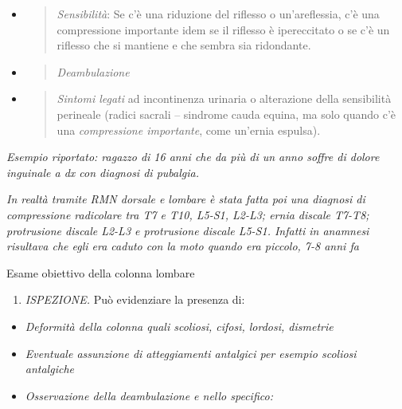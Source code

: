 \documentclass[]{article}
\begin{document}
\begin{itemize}
\item
  \begin{quote}
  \emph{\emph{Sensibilità}}: Se c'è una riduzione del riflesso o
  un'areflessia, c'è una compressione importante idem se il riflesso è
  ipereccitato o se c'è un riflesso che si mantiene e che sembra sia
  ridondante.
  \end{quote}
\end{itemize}

\begin{itemize}
\item
  \begin{quote}
  \emph{\emph{Deambulazione}}
  \end{quote}
\end{itemize}

\begin{itemize}
\item
  \begin{quote}
  \emph{\emph{Sintomi legati}} ad incontinenza urinaria o alterazione
  della sensibilità perineale (radici sacrali -- sindrome cauda equina,
  ma solo quando c'è una \emph{\emph{compressione importante}}, come
  un'ernia espulsa).
  \end{quote}
\end{itemize}

\emph{Esempio riportato: ragazzo di 16 anni che da più di un anno soffre
di dolore inguinale a dx con diagnosi di pubalgia. }

\emph{In realtà tramite RMN dorsale e lombare è stata fatta poi una
diagnosi di compressione radicolare tra T7 e T10, L5-S1, L2-L3; ernia
discale T7-T8; protrusione discale L2-L3 e protrusione discale L5-S1.
Infatti in anamnesi risultava che egli era caduto con la moto quando era
piccolo, 7-8 anni fa}

Esame obiettivo della colonna lombare

\begin{enumerate}
\def\labelenumi{\arabic{enumi}.}
\item
  \emph{ISPEZIONE.} Può evidenziare la presenza di:
\end{enumerate}

\begin{itemize}
\item
  \emph{Deformità della colonna quali scoliosi, cifosi, lordosi,
  dismetrie}
\item
  \emph{Eventuale assunzione di atteggiamenti antalgici per esempio
  scoliosi antalgiche}
\item
  \emph{Osservazione della deambulazione e nello specifico:}
\end{itemize}
\end{document}
